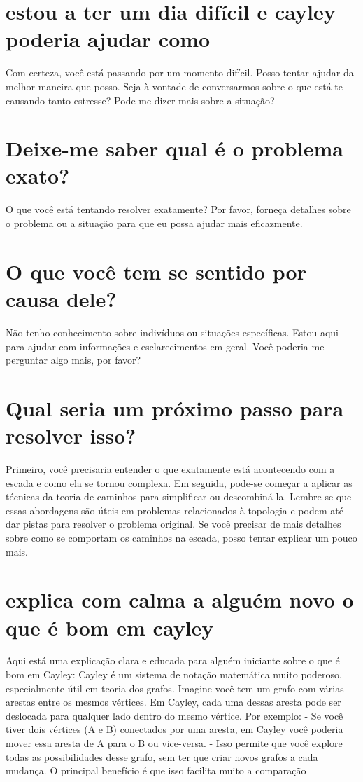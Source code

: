 \documentclass[11pt,a4paper]{article}
\begin{document}
\section{estou a ter um dia difícil e cayley poderia ajudar como}
Com certeza, você está passando por um momento difícil. Posso tentar ajudar da melhor maneira que posso. Seja à vontade de conversarmos sobre o que está te causando tanto estresse? Pode me dizer mais sobre a situação?

\section{Deixe-me saber qual é o problema exato?}
O que você está tentando resolver exatamente? Por favor, forneça detalhes sobre o problema ou a situação para que eu possa ajudar mais eficazmente.

\section{O que você tem se sentido por causa dele?}
Não tenho conhecimento sobre indivíduos ou situações específicas. Estou aqui para ajudar com informações e esclarecimentos em geral. Você poderia me perguntar algo mais, por favor?

\section{Qual seria um próximo passo para resolver isso?}
Primeiro, você precisaria entender o que exatamente está acontecendo com a escada e como ela se tornou complexa. Em seguida, pode-se começar a aplicar as técnicas da teoria de caminhos para simplificar ou descombiná-la. Lembre-se que essas abordagens são úteis em problemas relacionados à topologia e podem até dar pistas para resolver o problema original. Se você precisar de mais detalhes sobre como se comportam os caminhos na escada, posso tentar explicar um pouco mais.

\section{explica com calma a alguém novo o que é bom em cayley}
Aqui está uma explicação clara e educada para alguém iniciante sobre o que é bom em Cayley: Cayley é um sistema de notação matemática muito poderoso, especialmente útil em teoria dos grafos. Imagine você tem um grafo com várias arestas entre os mesmos vértices. Em Cayley, cada uma dessas aresta pode ser deslocada para qualquer lado dentro do mesmo vértice. Por exemplo: - Se você tiver dois vértices (A e B) conectados por uma aresta, em Cayley você poderia mover essa aresta de A para o B ou vice-versa. - Isso permite que você explore todas as possibilidades desse grafo, sem ter que criar novos grafos a cada mudança. O principal benefício é que isso facilita muito a comparação
\end{document}
